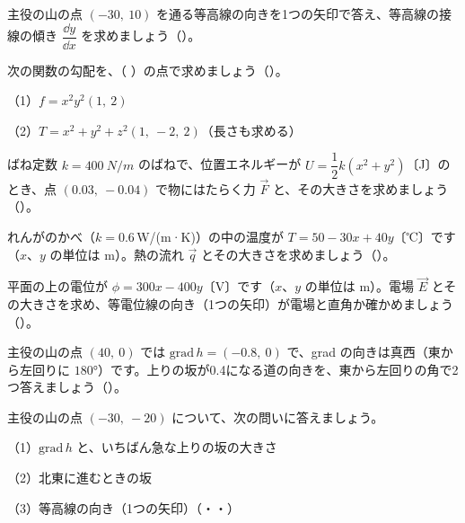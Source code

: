 \bkproblem 主役の山の点 $(-30,\ 10)$ を通る等高線の向きを1つの矢印で答え、等高線の接線の傾き $\dfrac{\dd y}{\dd x}$ を求めましょう\mbox{（）}。

\bkproblem 次の関数の勾配を、（ ）の点で求めましょう\mbox{（）}。\par
（1）$f=x^2y^2$\quad $(1,\ 2)$\par
（2）$T=x^2+y^2+z^2$\quad $(1,\ -2,\ 2)$（長さも求める）

\bkproblem ばね定数 $k=\qty{400}{N/m}$ のばねで、位置エネルギーが $U=\dfrac12k(x^2+y^2)$〔J〕のとき、点 $(0.03,\ -0.04)$ で物にはたらく力 $\vec F$ と、その大きさを求めましょう\mbox{（）}。

\bkproblem れんがのかべ（$k=0.6$\,W/(m·K)）の中の温度が $T=50-30x+40y$〔℃〕です（$x$、$y$ の単位は m）。熱の流れ $\vec q$ とその大きさを求めましょう\mbox{（）}。


\bkproblem 平面の上の電位が $\phi=300x-400y$〔V〕です（$x$、$y$ の単位は m）。電場 $\vec E$ とその大きさを求め、等電位線の向き（1つの矢印）が電場と直角か確かめましょう\mbox{（）}。

\bkproblem 主役の山の点 $(40,\ 0)$ では $\mathrm{grad}\,h=(-0.8,\ 0)$ で、grad の向きは真西（東から左回りに $180°$）です。上りの坂が0.4になる道の向きを、東から左回りの角で2つ答えましょう\mbox{（）}。

\bkproblem 主役の山の点 $(-30,\ -20)$ について、次の問いに答えましょう。\par
（1）$\mathrm{grad}\,h$ と、いちばん急な上りの坂の大きさ\par
（2）北東に進むときの坂\par
（3）等高線の向き（1つの矢印）\mbox{（・・）}

